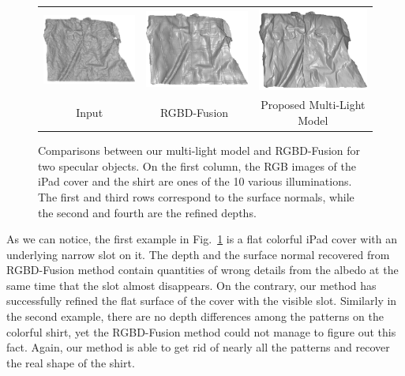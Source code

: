 \begin{figure}[!ht]
{\begin{tabular}{c|c c}
   \includegraphics[height = 0.23\linewidth]{figures/result/robust_patternShirt_shape_init.pdf} 
   &
   \includegraphics[height = 0.23\linewidth]{figures/result/rgbd_patternShirt_shape.pdf} &
   \includegraphics[height = 0.23\linewidth]{figures/result/robust_patternShirt_shape.pdf}\\

   {Input} & {RGBD-Fusion~\cite{or2015rgbd}} & {Proposed Multi-Light Model}               
 \end{tabular}}
\caption{Comparisons between our multi-light model and RGBD-Fusion for two specular objects. On the first column, the RGB images of the iPad cover and the shirt are ones of the 10 various illuminations. The first and third rows correspond to the surface normals, while the second and fourth are the refined depths.}
\label{fig:comp_complicated_albedo}
\end{figure}
As we can notice, the first example in Fig.~\ref{fig:comp_complicated_albedo} is a flat colorful iPad cover with an underlying narrow slot on it.
The depth and the surface normal recovered from RGBD-Fusion method contain quantities of wrong details from the albedo at the same time that the slot almost disappears.
On the contrary, our method has successfully refined the flat surface of the cover with the visible slot.
Similarly in the second example, there are no depth differences among the patterns on the colorful shirt, yet the RGBD-Fusion method could not manage to figure out this fact.
Again, our method is able to get rid of nearly all the patterns and recover the real shape of the shirt. 

